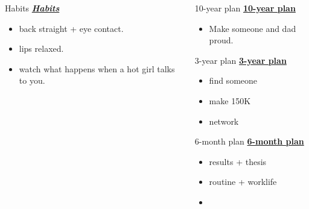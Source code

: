 \begin{columns}
\begin{column}{0.333\columnwidth}
\begin{columns}
\begin{column}{0.22\columnwidth}
\ifdefined\POSTER
    \begin{block}{Habits}
\else
 \underline{\bf \it Habits} 
\fi 
      \begin{itemize} 
        \tiny \item \tiny back straight + eye contact. 
      \item \tiny lips relaxed. 
      \item \tiny watch what happens when a hot girl talks to you. 
      \end{itemize}
\ifdefined\POSTER
    \end{block} 
  \end{column} %
\fi

\ifdefined\POSTER
  \begin{column}{0.5\columnwidth}
    \begin{block}{10-year plan}   %
\else 
 \underline{\bf 10-year plan}
\fi
      \begin{itemize}
      \item \small Make someone and dad proud.
      \end{itemize}
\ifdefined\POSTER
    \end{block}
\fi

\ifdefined\POSTER 
    \begin{block}{3-year plan}
\else
\underline{\bf 3-year plan} 
\fi
      \begin{itemize}
      \item \small find someone
      \item \small make 150K
      \item \small network
      \end{itemize}
\ifdefined\POSTER
    \end{block} 
\fi

\ifdefined\POSTER
    \begin{block}{6-month plan}
\else
\underline{\bf 6-month plan}
\fi
        \begin{itemize}
          \small \item \small results + thesis
          \item \small routine + worklife
          \item \small             
          \end{itemize}
\ifdefined\POSTER
    \end{block} 
\fi



\end{column}
\end{columns}
\end{column}
\end{columns}
